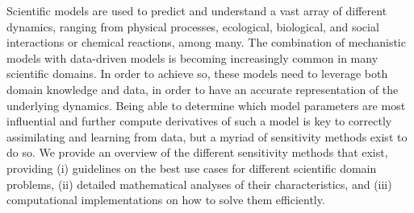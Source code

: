 Scientific models are used to predict and understand a vast array of different dynamics, ranging from physical processes, ecological, biological, and social interactions or chemical reactions, among many. 
The combination of mechanistic models with data-driven models is becoming increasingly common in many scientific domains. 
In order to achieve so, these models need to leverage both domain knowledge and data, in order to have an accurate representation of the underlying dynamics. 
Being able to determine which model parameters are most influential and further compute derivatives of such a model is key to correctly assimilating and learning from data, but a myriad of sensitivity methods exist to do so. 
We provide an overview of the different sensitivity methods that exist, providing (i) guidelines on the best use cases for different scientific domain problems, (ii) detailed mathematical analyses of their characteristics, and (iii) computational implementations on how to solve them efficiently. 
